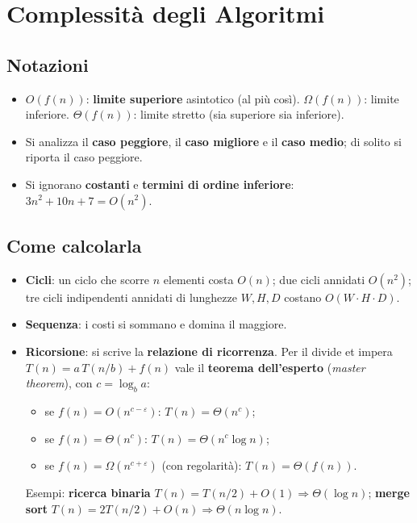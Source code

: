 \section{Complessità degli Algoritmi}

\subsection{Notazioni}
\begin{itemize}
    \item $O(f(n))$: \textbf{limite superiore} asintotico (al più così). $\Omega(f(n))$: limite inferiore. $\Theta(f(n))$: limite stretto (sia superiore sia inferiore).
    \item Si analizza il \textbf{caso peggiore}, il \textbf{caso migliore} e il \textbf{caso medio}; di solito si riporta il caso peggiore.
    \item Si ignorano \textbf{costanti} e \textbf{termini di ordine inferiore}: $3n^2 + 10n + 7 = O(n^2)$.
\end{itemize}

\subsection{Come calcolarla}
\begin{itemize}
    \item \textbf{Cicli}: un ciclo che scorre $n$ elementi costa $O(n)$; due cicli annidati $O(n^2)$; tre cicli indipendenti annidati di lunghezze $W, H, D$ costano $O(W \cdot H \cdot D)$.
    \item \textbf{Sequenza}: i costi si sommano e domina il maggiore.
    \item \textbf{Ricorsione}: si scrive la \textbf{relazione di ricorrenza}. Per il divide et impera $T(n) = a\,T(n/b) + f(n)$ vale il \textbf{teorema dell'esperto} (\emph{master theorem}), con $c = \log_b a$:
    \begin{itemize}
        \item se $f(n) = O(n^{c-\varepsilon})$: $T(n) = \Theta(n^c)$;
        \item se $f(n) = \Theta(n^c)$: $T(n) = \Theta(n^c \log n)$;
        \item se $f(n) = \Omega(n^{c+\varepsilon})$ (con regolarità): $T(n) = \Theta(f(n))$.
    \end{itemize}
    Esempi: \textbf{ricerca binaria} $T(n)=T(n/2)+O(1)\Rightarrow\Theta(\log n)$; \textbf{merge sort} $T(n)=2T(n/2)+O(n)\Rightarrow\Theta(n\log n)$.
\end{itemize}

